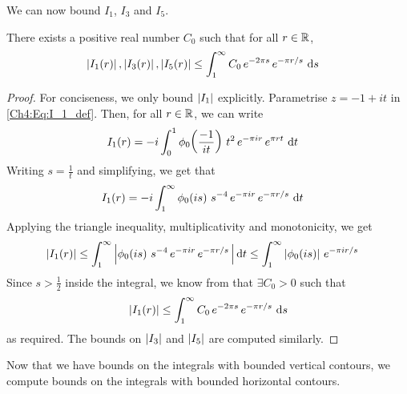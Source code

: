 We can now bound $I_1$, $I_3$ and $I_5$.

\begin{boxlemma}\label{Ch4:Lemma:Bound_I1_I3_I5}
    There exists a positive real number $C_0$ such that for all $r \in \mathbb{R}$,
    \begin{align*}
        \left\lvert I_1(r) \right\rvert, \left\lvert I_3(r) \right\rvert, \left\lvert I_5(r) \right\rvert &\leq \int_{1}^{\infty} C_0 \, e^{-2\pi s} \, e^{-\pi r/s} \, \operatorname{d}\!{s}
    \end{align*}
\end{boxlemma}
\begin{proof}
    For conciseness, we only bound $\left\lvert I_1 \right\rvert$ explicitly. Parametrise $z = -1 + it$ in \eqref{Ch4:Eq:I_1_def}. Then, for all $r \in \mathbb{R}$, we can write
    \begin{align*}
        I_1(r) &= -i \int_{0}^{1}
            \phi_0\!\left( \frac{-1}{it} \right) \,
            t^2 \,
            e^{-\pi i r} \,
            e^{\pi r t}\,
            \operatorname{d}\!{t}
    \end{align*}
    Writing $s = \frac{1}{t}$ and simplifying, we get that
    \begin{align*}
        I_1(r) &= -i \int_{1}^{\infty}
            \phi_0\!\left( is \right) \,
            s^{-4} \,
            e^{-\pi i r} \,
            e^{-\pi r / s}\,
            \operatorname{d}\!{t}
    \end{align*}
    Applying the triangle inequality, multiplicativity and monotonicity, we get
    \begin{align*}
        \left\lvert I_1(r) \right\rvert &\leq \int_{1}^{\infty} \left\lvert 
            \phi_0\!\left( is \right) \,
            s^{-4} \,
            e^{-\pi i r} \,
            e^{-\pi r / s}\,
             \right\rvert \operatorname{d}\!{t}
        \leq \int_{1}^{\infty}
            \left\lvert \phi_0\!\left( is \right) \right\rvert \,
            e^{-\pi i r/s}
    \end{align*}
    Since $s > \frac{1}{2}$ inside the integral, we know from  that $\exists C_0 > 0$ such that
    \begin{align*}
        \left\lvert I_1(r) \right\rvert \leq \int_{1}^{\infty} C_0 \, e^{-2\pi s} \, e^{-\pi r/s} \, \operatorname{d}\!{s}
    \end{align*}
    as required. The bounds on $\left\lvert I_3 \right\rvert$ and $\left\lvert I_5 \right\rvert$ are computed similarly.
\end{proof}

Now that we have bounds on the integrals with bounded vertical contours, we compute bounds on the integrals with bounded horizontal contours.

